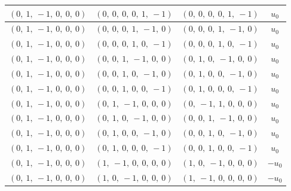 \documentclass[11pt]{article}
\theoremstyle{definition}
\begin{document}
\begin{longtable}{|l|l|l|c|}
    \hline
    $\left( 0, \  1, \  -1, \  0, \  0, \  0\right)$ & $\left( 0, \  0, \  0, \  0, \  1, \  -1\right)$ & $\left( 0, \  0, \  0, \  0, \  1, \  -1\right)$ & $u_{0}$ \\
    \hline
    $\left( 0, \  1, \  -1, \  0, \  0, \  0\right)$ & $\left( 0, \  0, \  0, \  1, \  -1, \  0\right)$ & $\left( 0, \  0, \  0, \  1, \  -1, \  0\right)$ & $u_{0}$ \\
    \hline
    $\left( 0, \  1, \  -1, \  0, \  0, \  0\right)$ & $\left( 0, \  0, \  0, \  1, \  0, \  -1\right)$ & $\left( 0, \  0, \  0, \  1, \  0, \  -1\right)$ & $u_{0}$ \\
    \hline
    $\left( 0, \  1, \  -1, \  0, \  0, \  0\right)$ & $\left( 0, \  0, \  1, \  -1, \  0, \  0\right)$ & $\left( 0, \  1, \  0, \  -1, \  0, \  0\right)$ & $u_{0}$ \\
    \hline
    $\left( 0, \  1, \  -1, \  0, \  0, \  0\right)$ & $\left( 0, \  0, \  1, \  0, \  -1, \  0\right)$ & $\left( 0, \  1, \  0, \  0, \  -1, \  0\right)$ & $u_{0}$ \\
    \hline
    $\left( 0, \  1, \  -1, \  0, \  0, \  0\right)$ & $\left( 0, \  0, \  1, \  0, \  0, \  -1\right)$ & $\left( 0, \  1, \  0, \  0, \  0, \  -1\right)$ & $u_{0}$ \\
    \hline
    $\left( 0, \  1, \  -1, \  0, \  0, \  0\right)$ & $\left( 0, \  1, \  -1, \  0, \  0, \  0\right)$ & $\left( 0, \  -1, \  1, \  0, \  0, \  0\right)$ & $u_{0}$ \\
    \hline
    $\left( 0, \  1, \  -1, \  0, \  0, \  0\right)$ & $\left( 0, \  1, \  0, \  -1, \  0, \  0\right)$ & $\left( 0, \  0, \  1, \  -1, \  0, \  0\right)$ & $u_{0}$ \\
    \hline
    $\left( 0, \  1, \  -1, \  0, \  0, \  0\right)$ & $\left( 0, \  1, \  0, \  0, \  -1, \  0\right)$ & $\left( 0, \  0, \  1, \  0, \  -1, \  0\right)$ & $u_{0}$ \\
    \hline
    $\left( 0, \  1, \  -1, \  0, \  0, \  0\right)$ & $\left( 0, \  1, \  0, \  0, \  0, \  -1\right)$ & $\left( 0, \  0, \  1, \  0, \  0, \  -1\right)$ & $u_{0}$ \\
    \hline
    $\left( 0, \  1, \  -1, \  0, \  0, \  0\right)$ & $\left( 1, \  -1, \  0, \  0, \  0, \  0\right)$ & $\left( 1, \  0, \  -1, \  0, \  0, \  0\right)$ & $- u_{0}$ \\
    \hline
    $\left( 0, \  1, \  -1, \  0, \  0, \  0\right)$ & $\left( 1, \  0, \  -1, \  0, \  0, \  0\right)$ & $\left( 1, \  -1, \  0, \  0, \  0, \  0\right)$ & $- u_{0}$ \\

\end{longtable}
\end{document}
